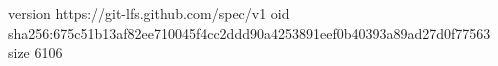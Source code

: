 version https://git-lfs.github.com/spec/v1
oid sha256:675c51b13af82ee710045f4cc2ddd90a4253891eef0b40393a89ad27d0f77563
size 6106
